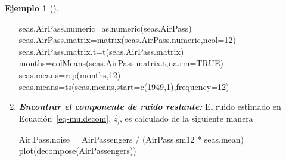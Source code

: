 \documentclass[
  us-letterpaper,
]{scrreprt}
\newenvironment{Shaded}{\begin{snugshade}}{\end{snugshade}}
\newcommand{\AttributeTok}[1]{\textcolor[rgb]{0.40,0.45,0.13}{#1}}
\newcommand{\ConstantTok}[1]{\textcolor[rgb]{0.56,0.35,0.01}{#1}}
\newcommand{\DecValTok}[1]{\textcolor[rgb]{0.68,0.00,0.00}{#1}}
\newcommand{\FunctionTok}[1]{\textcolor[rgb]{0.28,0.35,0.67}{#1}}
\newcommand{\NormalTok}[1]{\textcolor[rgb]{0.00,0.23,0.31}{#1}}
\newcommand{\OtherTok}[1]{\textcolor[rgb]{0.00,0.23,0.31}{#1}}
\newcommand{\SpecialCharTok}[1]{\textcolor[rgb]{0.37,0.37,0.37}{#1}}
\theoremstyle{plain}
\theoremstyle{definition}
\newtheorem{example}{Ejemplo}[chapter]
\theoremstyle{plain}
\theoremstyle{definition}
\theoremstyle{remark}
\begin{document}
\begin{example}[]
\begin{tcolorbox}
\begin{enumerate}
\begin{Shaded}
\begin{Highlighting}[]
\NormalTok{seas.AirPass.numeric}\OtherTok{=}\FunctionTok{as.numeric}\NormalTok{(seas.AirPass) }
\NormalTok{seas.AirPass.matrix}\OtherTok{=}\FunctionTok{matrix}\NormalTok{(seas.AirPass.numeric,}\AttributeTok{ncol=}\DecValTok{12}\NormalTok{) }
\NormalTok{seas.AirPass.matrix.t}\OtherTok{=}\FunctionTok{t}\NormalTok{(seas.AirPass.matrix) }
\NormalTok{months}\OtherTok{=}\FunctionTok{colMeans}\NormalTok{(seas.AirPass.matrix.t,}\AttributeTok{na.rm=}\ConstantTok{TRUE}\NormalTok{) }
\NormalTok{seas.means}\OtherTok{=}\FunctionTok{rep}\NormalTok{(months,}\DecValTok{12}\NormalTok{) }
\NormalTok{seas.means}\OtherTok{=}\FunctionTok{ts}\NormalTok{(seas.means,}\AttributeTok{start=}\FunctionTok{c}\NormalTok{(}\DecValTok{1949}\NormalTok{,}\DecValTok{1}\NormalTok{),}\AttributeTok{frequency=}\DecValTok{12}\NormalTok{)}
\end{Highlighting}
\end{Shaded}
\item
  \textbf{\emph{Encontrar el componente de ruido restante:}} El ruido
  estimado en Ecuación~\ref{eq-muldecom}, \(\hat{z_{_t}}\), es calculado
  de la siguiente manera

\begin{Shaded}
\begin{Highlighting}[]
\NormalTok{Air.Pass.noise }\OtherTok{=}\NormalTok{ AirPassengers }\SpecialCharTok{/}\NormalTok{ (AirPass.sm12 }\SpecialCharTok{*}\NormalTok{ seas.mean)}
\FunctionTok{plot}\NormalTok{(}\FunctionTok{decompose}\NormalTok{(AirPassengers))}
\end{Highlighting}
\end{Shaded}

  \begin{figure}[H]

\end{figure}
\end{enumerate}
\end{tcolorbox}
\end{example}
\end{document}
